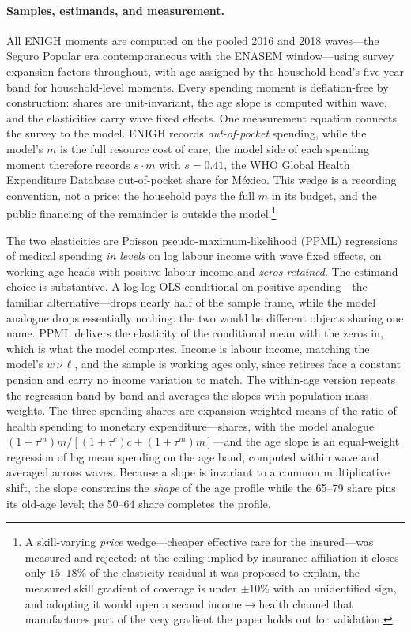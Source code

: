 \documentclass[12pt,a4paper]{article}
\begin{document}
\paragraph{Samples, estimands, and measurement.} All ENIGH moments are computed on the pooled 2016 and 2018 waves---the Seguro Popular era contemporaneous with the ENASEM window---using survey expansion factors throughout, with age assigned by the household head's five-year band for household-level moments. Every spending moment is deflation-free by construction: shares are unit-invariant, the age slope is computed within wave, and the elasticities carry wave fixed effects. One measurement equation connects the survey to the model. ENIGH records \emph{out-of-pocket} spending, while the model's $m$ is the full resource cost of care; the model side of each spending moment therefore records $s\cdot m$ with $s=0.41$, the WHO Global Health Expenditure Database out-of-pocket share for M\'exico. This wedge is a recording convention, not a price: the household pays the full $m$ in its budget, and the public financing of the remainder is outside the model.\footnote{A skill-varying \emph{price} wedge---cheaper effective care for the insured---was measured and rejected: at the ceiling implied by insurance affiliation it closes only $15$--$18\%$ of the elasticity residual it was proposed to explain, the measured skill gradient of coverage is under $\pm10\%$ with an unidentified sign, and adopting it would open a second income$\to$health channel that manufactures part of the very gradient the paper holds out for validation.}

The two elasticities are Poisson pseudo-maximum-likelihood (PPML) regressions of medical spending \emph{in levels} on log labour income with wave fixed effects, on working-age heads with positive labour income and \emph{zeros retained}. The estimand choice is substantive. A log-log OLS conditional on positive spending---the familiar alternative---drops nearly half of the sample frame, while the model analogue drops essentially nothing: the two would be different objects sharing one name. PPML delivers the elasticity of the conditional mean with the zeros in, which is what the model computes. Income is labour income, matching the model's $w\,\nu\,\ell$, and the sample is working ages only, since retirees face a constant pension and carry no income variation to match. The within-age version repeats the regression band by band and averages the slopes with population-mass weights. The three spending shares are expansion-weighted means of the ratio of health spending to monetary expenditure---shares, with the model analogue $(1+\tau^m)m/[(1+\tau^c)c+(1+\tau^m)m]$---and the age slope is an equal-weight regression of log mean spending on the age band, computed within wave and averaged across waves. Because a slope is invariant to a common multiplicative shift, the slope constrains the \emph{shape} of the age profile while the 65--79 share pins its old-age level; the 50--64 share completes the profile.
\end{document}

